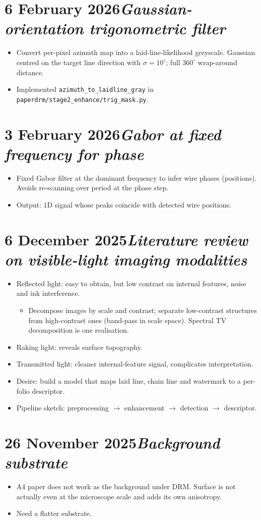 \documentclass[11pt,a4paper]{article}
\newcommand{\logentry}[2]{\section*{#1\hfill\normalfont\normalsize\textit{#2}}}
\begin{document}
\logentry{6 February 2026}{Gaussian-orientation trigonometric filter}
\begin{itemize}
  \item Convert per-pixel azimuth map into a laid-line-likelihood greyscale. Gaussian centred on the target line direction with $\sigma = 10^\circ$; full $360^\circ$ wrap-around distance.
  \item Implemented \texttt{azimuth\_to\_laidline\_gray} in \texttt{paperdrm/stage2\_enhance/trig\_mask.py}.
\end{itemize}

\logentry{3 February 2026}{Gabor at fixed frequency for phase}
\begin{itemize}
  \item Fixed Gabor filter at the dominant frequency to infer wire phases (positions). Avoids re-scanning over period at the phase step.
  \item Output: $1$D signal whose peaks coincide with detected wire positions.
\end{itemize}


\logentry{6 December 2025}{Literature review on visible-light imaging modalities}
\begin{itemize}
  \item Reflected light: easy to obtain, but low contrast on internal features, noise and ink interference.
  \begin{itemize}
    \item Decompose images by scale and contrast; separate low-contrast structures from high-contrast ones (band-pass in scale space). Spectral TV decomposition is one realisation.
  \end{itemize}
  \item Raking light: reveals surface topography.
  \item Transmitted light: cleaner internal-feature signal, complicates interpretation.
  \item Desire: build a model that maps laid line, chain line and watermark to a per-folio descriptor.
  \item Pipeline sketch: preprocessing $\to$ enhancement $\to$ detection $\to$ descriptor.
\end{itemize}

\logentry{26 November 2025}{Background substrate}
\begin{itemize}
  \item A4 paper does not work as the background under DRM. Surface is not actually even at the microscope scale and adds its own anisotropy.
  \item Need a flatter substrate.
\end{itemize}
\end{document}
